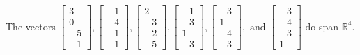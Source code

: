\begin{exercise}
\begin{exerciseStatement}
  \end{exerciseStatement}
  \begin{exerciseAnswer}
   The vectors \(\left[\begin{array}{r}
3 \\
0 \\
-5 \\
-1
\end{array}\right] , \left[\begin{array}{r}
-1 \\
-4 \\
-1 \\
-1
\end{array}\right] , \left[\begin{array}{r}
2 \\
-3 \\
-2 \\
-5
\end{array}\right] , \left[\begin{array}{r}
-1 \\
-3 \\
1 \\
-3
\end{array}\right] , \left[\begin{array}{r}
-3 \\
1 \\
-4 \\
-3
\end{array}\right] , \text{ and } \left[\begin{array}{r}
-3 \\
-4 \\
-3 \\
1
\end{array}\right]\) 
  	 do  
	span \(\mathbb{R}^4\).
  


  \end{exerciseAnswer}
\end{exercise}